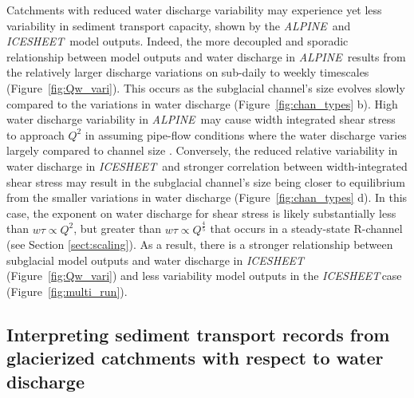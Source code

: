 \documentclass[tc, manuscript]{copernicus}
\newcommand{\alpine}{\textit{ALPINE}\,}
\newcommand{\icesheet}{\textit{ICESHEET}\,}
\begin{document}
Catchments with reduced water discharge variability may experience yet less variability in sediment transport capacity, shown by the \alpine{} and \icesheet{} model outputs.
Indeed, the more decoupled and sporadic relationship between model outputs and water discharge in \alpine{} results from the relatively larger discharge variations on sub-daily to weekly timescales (Figure~\ref{fig:Qw_vari}).
This occurs as the subglacial channel's size evolves slowly compared to the variations in water discharge (Figure~\ref{fig:chan_types} b).
High water discharge variability in \alpine{} may cause width integrated shear stress to approach $Q^{2}$ in assuming pipe-flow conditions where the water discharge varies largely compared to channel size \citep[Figure~\ref{fig:chan_types}; Section \ref{sect:scaling}; c.f.][]{alley1997}.
Conversely, the reduced relative variability in water discharge in \icesheet{} and stronger correlation between width-integrated shear stress may result in the subglacial channel's size being closer to equilibrium from the smaller variations in water discharge (Figure~\ref{fig:chan_types} d).
In this case, the exponent on water discharge for shear stress is likely substantially less than $w\tau \propto Q^2$, but greater than $w \tau \propto Q^{\frac{4}{5}}$ that occurs in a steady-state R-channel (see Section \ref{sect:scaling}).
As a result, there is a stronger relationship between subglacial model outputs and water discharge in \icesheet{} (Figure~\ref{fig:Qw_vari}) and less variability model outputs in the \icesheet case (Figure~\ref{fig:multi_run}).

\subsection{Interpreting sediment transport records from glacierized catchments with respect to water discharge}
\end{document}
